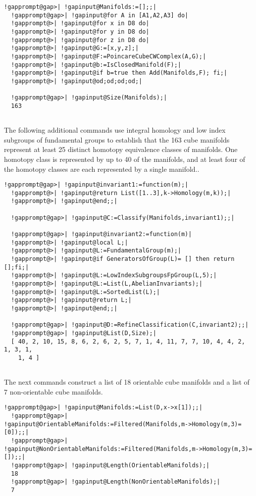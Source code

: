 \documentclass[a4paper,11pt]{report}
\begin{document}
{{\begin{Verbatim}[commandchars=!@|,fontsize=\small,frame=single,label=Example]
  !gapprompt@gap>| !gapinput@Manifolds:=[];;|
  !gapprompt@gap>| !gapinput@for A in [A1,A2,A3] do|
  !gapprompt@>| !gapinput@for x in D8 do|
  !gapprompt@>| !gapinput@for y in D8 do|
  !gapprompt@>| !gapinput@for z in D8 do|
  !gapprompt@>| !gapinput@G:=[x,y,z];|
  !gapprompt@>| !gapinput@F:=PoincareCubeCWComplex(A,G);|
  !gapprompt@>| !gapinput@b:=IsClosedManifold(F);|
  !gapprompt@>| !gapinput@if b=true then Add(Manifolds,F); fi;|
  !gapprompt@>| !gapinput@od;od;od;od;|
  
  !gapprompt@gap>| !gapinput@Size(Manifolds);|
  163
  
\end{Verbatim}
 The following additional commands use integral homology and low index
subgroups of fundamental groups to establish that the 163 cube manifolds
represent at least 25 distinct homotopy equivalence classes of manifolds. One
homotopy class is represented by up to 40 of the manifolds, and at least four
of the homotopy classes are each represented by a single manifold.. 
\begin{Verbatim}[commandchars=!@|,fontsize=\small,frame=single,label=Example]
  !gapprompt@gap>| !gapinput@invariant1:=function(m);|
  !gapprompt@>| !gapinput@return List([1..3],k->Homology(m,k));|
  !gapprompt@>| !gapinput@end;;|
  
  !gapprompt@gap>| !gapinput@C:=Classify(Manifolds,invariant1);;|
  
  !gapprompt@gap>| !gapinput@invariant2:=function(m)|
  !gapprompt@>| !gapinput@local L;|
  !gapprompt@>| !gapinput@L:=FundamentalGroup(m);|
  !gapprompt@>| !gapinput@if GeneratorsOfGroup(L)= [] then return [];fi;|
  !gapprompt@>| !gapinput@L:=LowIndexSubgroupsFpGroup(L,5);|
  !gapprompt@>| !gapinput@L:=List(L,AbelianInvariants);|
  !gapprompt@>| !gapinput@L:=SortedList(L);|
  !gapprompt@>| !gapinput@return L;|
  !gapprompt@>| !gapinput@end;;|
  
  !gapprompt@gap>| !gapinput@D:=RefineClassification(C,invariant2);;|
  !gapprompt@gap>| !gapinput@List(D,Size);|
  [ 40, 2, 10, 15, 8, 6, 2, 6, 2, 5, 7, 1, 4, 11, 7, 7, 10, 4, 4, 2, 1, 3, 1, 
    1, 4 ]
  
\end{Verbatim}
 The next commands construct a list of 18 orientable cube manifolds and a list
of 7 non-orientable cube manifolds. 
\begin{Verbatim}[commandchars=!@|,fontsize=\small,frame=single,label=Example]
  !gapprompt@gap>| !gapinput@Manifolds:=List(D,x->x[1]);;|
  !gapprompt@gap>| !gapinput@OrientableManifolds:=Filtered(Manifolds,m->Homology(m,3)=[0]);;|
  !gapprompt@gap>| !gapinput@NonOrientableManifolds:=Filtered(Manifolds,m->Homology(m,3)=[]);;|
  !gapprompt@gap>| !gapinput@Length(OrientableManifolds);|
  18
  !gapprompt@gap>| !gapinput@Length(NonOrientableManifolds);|
  7
  

\end{Verbatim}}}
\end{document}
